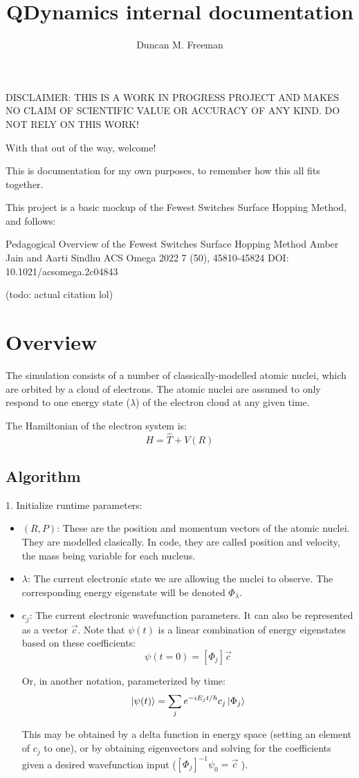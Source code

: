 \documentclass[12pt]{article}
\title{QDynamics internal documentation}
\author{Duncan M. Freeman}
\newcommand{\eigbasis}[0]{[\Phi_j]}
\begin{document}
\maketitle
DISCLAIMER: THIS IS A WORK IN PROGRESS PROJECT AND MAKES NO CLAIM OF SCIENTIFIC VALUE OR ACCURACY OF ANY KIND. DO NOT RELY ON THIS WORK!

With that out of the way, welcome!

This is documentation for my own purposes, to remember how this all fits together.

This project is a basic mockup of the Fewest Switches Surface Hopping
Method, and follows:

Pedagogical Overview of the Fewest Switches Surface Hopping Method
Amber Jain and Aarti Sindhu
ACS Omega 2022 7 (50), 45810-45824
DOI: 10.1021/acsomega.2c04843

(todo: actual citation lol)
\clearpage

\section{Overview}
The simulation consists of a number of classically-modelled atomic nuclei, which are orbited by a cloud of electrons. The atomic nuclei are assumed to only respond to one energy state ($\lambda$) of the electron cloud at any given time. 

The Hamiltonian of the electron system is:
\[ H = \hat{T} + V(R) \]

\subsection{Algorithm}

1. Initialize runtime parameters:
\begin{itemize}
    \item $(R, P)$: These are the position and momentum vectors of the atomic nuclei. They are modelled clasically. In code, they are called position and velocity, the mass being variable for each nucleus.
    \item $\lambda$: The current electronic state we are allowing the nuclei to observe. The corresponding energy eigenstate will be denoted $\Phi_\lambda$.
    \item $c_j$: The current electronic wavefunction parameters. It can also be represented as a vector $\vec{c}$. Note that $\psi(t)$ is a linear combination of energy eigenstates based on these coefficients: 
        \[ \psi(t=0) = \eigbasis \vec{c} \]

        Or, in another notation, parameterized by time:
        \[ \ket{\psi(t)} = \sum_j e^{-iE_jt/\hbar} c_j \ket{\Phi_j} \]

        This may be obtained by a delta function in energy space (setting an element of $c_j$ to one), or by obtaining eigenvectors and solving for the coefficients given a desired wavefunction input ($\eigbasis^{-1} \psi_0 = \vec{c}$ ).
\end{itemize}
\end{document}
